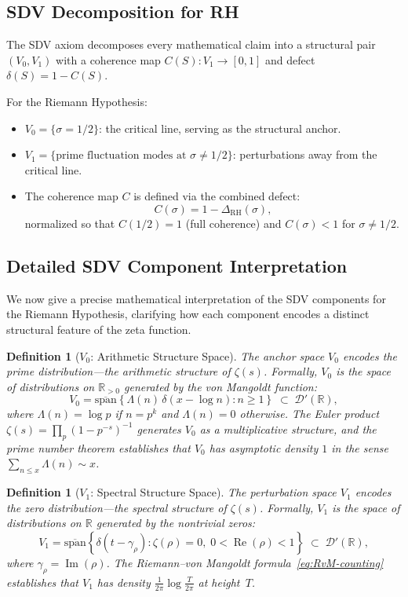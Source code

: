 \documentclass[11pt]{article}
\newtheorem{definition}[theorem]{Definition}
\theoremstyle{remark}
\DeclareMathOperator{\Ima}{Im}
\DeclareMathOperator{\Rea}{Re}
\begin{document}
\subsection{SDV Decomposition for RH}
\label{subsec:sdv}

The SDV axiom decomposes every mathematical claim into a structural pair
$(V_0,V_1)$ with a coherence map $C(S)\colon V_1\to[0,1]$ and defect $\delta(S)=1-C(S)$.

For the Riemann Hypothesis:
\begin{itemize}
  \item $V_0 = \{\sigma=1/2\}$: the critical line, serving as the structural anchor.
  \item $V_1 = \{\text{prime fluctuation modes at } \sigma\neq 1/2\}$: perturbations away
    from the critical line.
  \item The coherence map $C$ is defined via the combined defect:
    \[
      C(\sigma) = 1 - \Delta_{\mathrm{RH}}(\sigma),
    \]
    normalized so that $C(1/2)=1$ (full coherence) and $C(\sigma)<1$ for $\sigma\neq 1/2$.
\end{itemize}

\subsection{Detailed SDV Component Interpretation}
\label{subsec:sdv-detailed}

We now give a precise mathematical interpretation of the SDV components for the
Riemann Hypothesis, clarifying how each component encodes a distinct structural
feature of the zeta function.

\begin{definition}[$V_0$: Arithmetic Structure Space]
\label{def:V0-detailed}
The anchor space $V_0$ encodes the \emph{prime distribution}---the arithmetic
structure of $\zeta(s)$.
Formally, $V_0$ is the space of distributions on $\mathbb{R}_{>0}$ generated by
the von Mangoldt function:
\[
  V_0 = \overline{\mathrm{span}}\!\left\{\Lambda(n)\,\delta(x - \log n)
  : n\geq 1\right\}
  \;\subset\; \mathcal{D}'(\mathbb{R}),
\]
where $\Lambda(n)=\log p$ if $n=p^k$ and $\Lambda(n)=0$ otherwise.
The Euler product $\zeta(s)=\prod_p(1-p^{-s})^{-1}$ generates $V_0$ as a
multiplicative structure, and the prime number theorem establishes that $V_0$ has
asymptotic density $1$ in the sense $\sum_{n\leq x}\Lambda(n)\sim x$.
\end{definition}

\begin{definition}[$V_1$: Spectral Structure Space]
\label{def:V1-detailed}
The perturbation space $V_1$ encodes the \emph{zero distribution}---the spectral
structure of $\zeta(s)$.
Formally, $V_1$ is the space of distributions on $\mathbb{R}$ generated by the
nontrivial zeros:
\[
  V_1 = \overline{\mathrm{span}}\!\left\{\delta(t-\gamma_\rho)
  : \zeta(\rho)=0,\; 0<\Rea(\rho)<1\right\}
  \;\subset\; \mathcal{D}'(\mathbb{R}),
\]
where $\gamma_\rho=\Ima(\rho)$.
The Riemann--von Mangoldt formula~\eqref{eq:RvM-counting} establishes that
$V_1$ has density $\frac{1}{2\pi}\log\frac{T}{2\pi}$ at height~$T$.
\end{definition}
\end{document}

